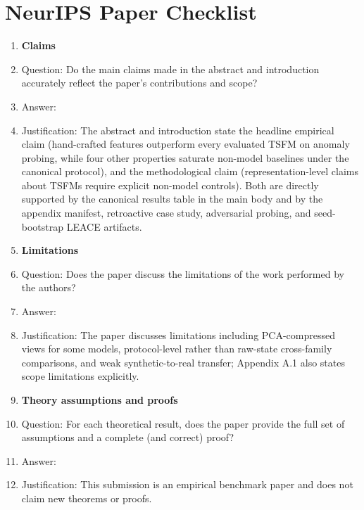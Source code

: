 \section*{NeurIPS Paper Checklist}

\begin{enumerate}

\item {\bf Claims}
    \item[] Question: Do the main claims made in the abstract and introduction accurately reflect the paper's contributions and scope?
    \item[] Answer: \answerYes{}
    \item[] Justification: The abstract and introduction state the headline empirical claim (hand-crafted features outperform every evaluated TSFM on anomaly probing, while four other properties saturate non-model baselines under the canonical protocol), and the methodological claim (representation-level claims about TSFMs require explicit non-model controls). Both are directly supported by the canonical results table in the main body and by the appendix manifest, retroactive case study, adversarial probing, and seed-bootstrap LEACE artifacts.

\item {\bf Limitations}
    \item[] Question: Does the paper discuss the limitations of the work performed by the authors?
    \item[] Answer: \answerYes{}
    \item[] Justification: The paper discusses limitations including PCA-compressed views for some models, protocol-level rather than raw-state cross-family comparisons, and weak synthetic-to-real transfer; Appendix A.1 also states scope limitations explicitly.

\item {\bf Theory assumptions and proofs}
    \item[] Question: For each theoretical result, does the paper provide the full set of assumptions and a complete (and correct) proof?
    \item[] Answer: \answerNA{}
    \item[] Justification: This submission is an empirical benchmark paper and does not claim new theorems or proofs.


\end{enumerate}
